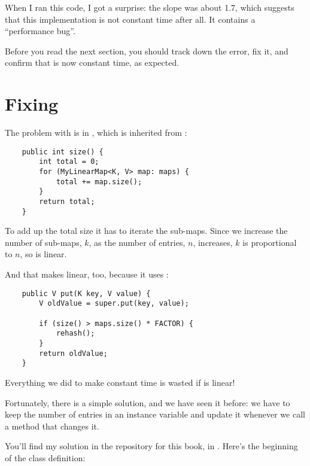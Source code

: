 \documentclass[12pt]{book}
\theoremstyle{exercise}
\begin{document}
When I ran this code, I got a surprise: the slope was about 1.7,
which suggests that this implementation is not constant time after all.
It contains a ``performance bug''. 


Before you read the next section, you should track down the error, fix
it, and confirm that  is now constant time, as expected.


\section{Fixing }
\label{fixing-myhashmap}


The problem with  is in , which is
inherited from :

\begin{verbatim}
    public int size() {
        int total = 0;
        for (MyLinearMap<K, V> map: maps) {
            total += map.size();
        }
        return total;
    }
\end{verbatim}

To add up the total size it has to iterate the sub-maps. Since we
increase the number of sub-maps, $k$, as the number of entries,
$n$, increases, $k$ is proportional to $n$, so
 is linear.


And that makes  linear, too, because it uses :

\begin{verbatim}
    public V put(K key, V value) {
        V oldValue = super.put(key, value);

        if (size() > maps.size() * FACTOR) {
            rehash();
        }
        return oldValue;
    }
\end{verbatim}

Everything we did to make  constant time is wasted if
 is linear!


Fortunately, there is a simple solution, and we have seen it before: we
have to keep the number of entries in an instance variable and update it
whenever we call a method that changes it.


You'll find my solution in the repository for this book, in
.  Here's the beginning of the class definition:
\end{document}
